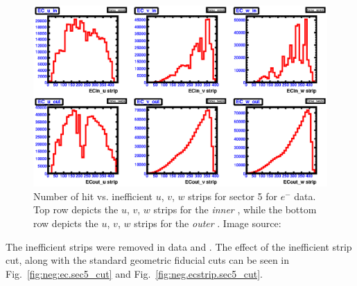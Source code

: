 \begin{figure}[htpb]\begin{center}
\includegraphics[width=\figwidth,height=\hfigheight]{figures/calib/ec/pim_ecuvw_NOKnockout_sec5.eps}
\caption[Number of hit vs. inefficient  $u$, $v$, $w$ strips for sector 5 for $e^-$ data]{\label{fig:neg.ecstrip.sec5} Number of hit vs. inefficient  $u$, $v$, $w$ strips for sector 5 for $e^-$ data. Top row depicts the $u$, $v$, $w$  strips for the \emph{inner} , while the bottom row depicts the $u$, $v$, $w$  strips for the \emph{outer} . Image source:~\cite{clas.thesis.kunkel}}
\end{center}\end{figure}
The inefficient strips were removed in data and . The effect of the inefficient strip cut, along with the standard   geometric fiducial cuts can be seen in Fig.~\ref{fig:neg:ec.sec5_cut} and Fig.~\ref{fig:neg.ecstrip.sec5_cut}.
%
